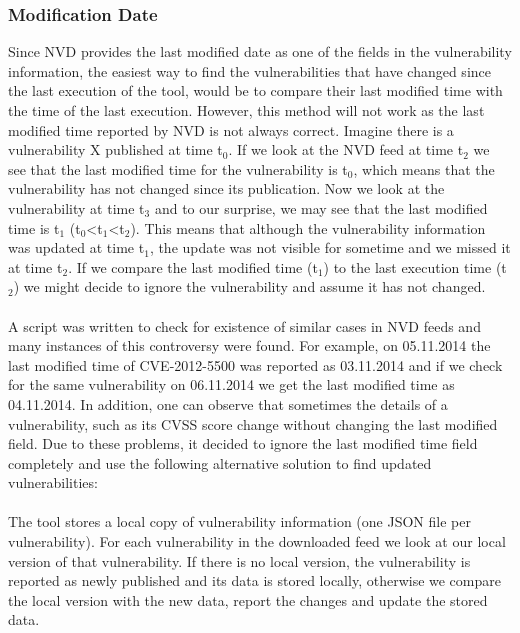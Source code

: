 \subsubsection{Modification Date}
Since NVD provides the last modified date as one of the fields in the vulnerability information, the easiest way to find the vulnerabilities that have changed since the last execution of the tool, would be to compare their last modified time with the time of the last execution. However, this method will not work as the last modified time reported by NVD is not always correct. Imagine there is a vulnerability X published at time t$_{\text{0}}$. If we look at the NVD feed at time t$_{\text{2}}$ we see that the last modified time for the vulnerability is t$_{\text{0}}$, which means that the vulnerability has not changed since its publication. Now we look at the vulnerability at time t$_{\text{3}}$ and to our surprise, we may see that the last modified time is t$_{\text{1}}$  (t$_{\text{0}}$<t$_{\text{1}}$<t$_{\text{2}}$). This means that although the vulnerability information was updated at time t$_{\text{1}}$, the update was not visible for sometime and we missed it at time t$_{\text{2}}$. If we compare the last modified time (t$_{\text{1}}$) to the last execution time (t$_{\text{2}}$) we might decide to ignore the vulnerability and assume it has not changed. 
\paragraph{}
A script was written to check for existence of similar cases in NVD feeds and many instances of this controversy were found. For example, on 05.11.2014 the last modified time of CVE-2012-5500 was reported as 03.11.2014 and if we check for the same vulnerability on 06.11.2014 we get the last modified time as 04.11.2014. In addition, one can observe that sometimes the details of a vulnerability, such as its CVSS score change without changing the last modified field. Due to these problems, it decided to ignore the last modified time field completely and use the following alternative solution to find updated vulnerabilities:
\paragraph{}
The tool stores a local copy of vulnerability information (one JSON file per vulnerability). For each vulnerability in the downloaded feed we look at our local version of that vulnerability. If there is no local version, the vulnerability is reported as newly published and its data is stored locally, otherwise we compare the local version with the new data, report the changes and update the stored data.
